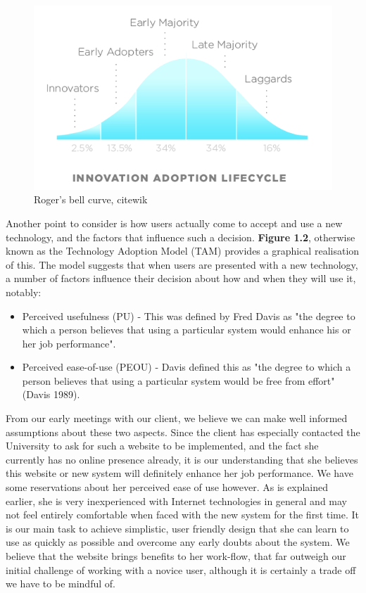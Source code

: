 \documentclass{l3proj}
\begin{document}
\begin{figure}
\begin{center}
\includegraphics[scale=0.6]{DiffusionOfInnovation}
\caption{Roger's bell curve, cite{wik}}
\end{center}
\end{figure}

Another point to consider is how users actually come to accept and use a
new technology, and the factors that influence such a decision. \textbf{Figure
1.2}, otherwise known as the Technology Adoption Model (TAM) provides a
graphical realisation of this.
\cite{wik} The model
suggests that when users are presented with a new technology, a number of
factors influence their decision about how and when they will use it, notably:

\begin{itemize}
\item Perceived usefulness (PU) - This was defined by Fred Davis as "the degree
to which a person believes that using a particular system would enhance his or
her job performance".
\item Perceived ease-of-use (PEOU) - Davis defined this as "the degree to which
a person believes that using a particular system would be free from effort"
(Davis 1989).	
\end{itemize}

From our early meetings with our client, we believe we can make well informed
assumptions about these two aspects. Since the client has especially contacted
the University to ask for such a website to be implemented, and the fact she
currently has no online presence already, it is our understanding that she
believes this website or new system will definitely enhance her job performance.
We have some reservations about her perceived ease of use however. As is
explained earlier, she is very inexperienced with Internet technologies in
general and may not feel entirely comfortable when faced with the new system for
the first time. It is our main task to achieve simplistic, user friendly design
that she can learn to use as quickly as possible and overcome any early doubts
about the system. We believe that the website brings benefits to her work-flow,
that far outweigh our initial challenge of working with a novice user, although it is
certainly a trade off we have to be mindful of. 
\end{document}
